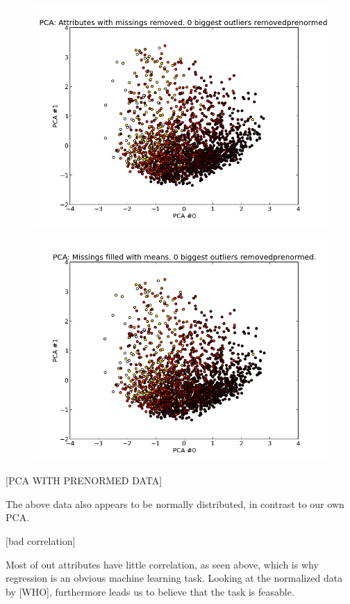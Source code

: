 \begin{minipage}{0.4\textwidth}
\begin{figure}
\includegraphics[width=\textwidth]{pca/attr-with-missings-removed_0-biggest-outliers-removed_prenormed_}
\end{figure}
\end{minipage}
\hfill
\begin{minipage}{0.4\textwidth}
\begin{figure}
\includegraphics[width=\textwidth]{pca/missings-filled-w-means_0-biggest-outliers-removed_prenormed_}
\end{figure}
\end{minipage}
[PCA WITH PRENORMED DATA]

The above data also appears to be normally distributed, in contrast to our own PCA.

[bad correlation]

Most of out attributes have little correlation, as seen above, which is why regression is an obvious machine learning task. Looking at the normalized data by [WHO], furthermore leads us to believe that the task is feasable.
